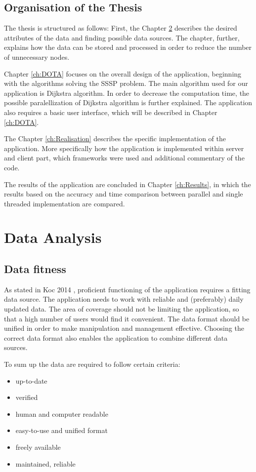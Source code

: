 \documentclass[thesis=M,english]{FITthesis}[2012/10/20]
\begin{document}
\section{Organisation of the Thesis}
The thesis is structured as follows: First, the Chapter \ref{ch:DA} describes the desired attributes of the data and finding possible data sources. The chapter, further, explains how the data can be stored and processed in order to reduce the number of unnecessary nodes. 

Chapter \ref{ch:DOTA} focuses on the overall design of the application, beginning with the algorithms solving the SSSP problem. The main algorithm used for our application is Dijkstra algorithm. In order to decrease the computation time, the possible paralellization of Dijkstra algorithm is further explained. The application also requires a basic user interface, which will be described in Chapter \ref{ch:DOTA}.

The Chapter \ref{ch:Realisation} describes the specific implementation of the application. More specifically how the application is implemented within server and client part, which frameworks were used and additional commentary of the code. 

The results of the application are concluded in Chapter \ref{ch:Results}, in which the results based on the accuracy and time comparison between parallel and single threaded implementation are compared.


\chapter{Data Analysis}
\label{ch:DA}

\section{Data fitness}
\label{S1: Good data}
As stated in Koc 2014 \cite{Koc14}, proficient functioning of the application requires a fitting data source. The application needs to work with reliable and (preferably) daily updated data. The area of coverage should not be limiting the application, so that a high number of users would find it convenient. The data format should be unified in order to make manipulation and management effective. Choosing the correct data format also enables the application to combine different data sources.

To sum up the data are required to follow certain criteria:
\begin{itemize}
	\item up-to-date
	\item verified
	\item human and computer readable
	\item easy-to-use and unified format
	\item freely available
	\item maintained, reliable
\end{itemize}
\end{document}
